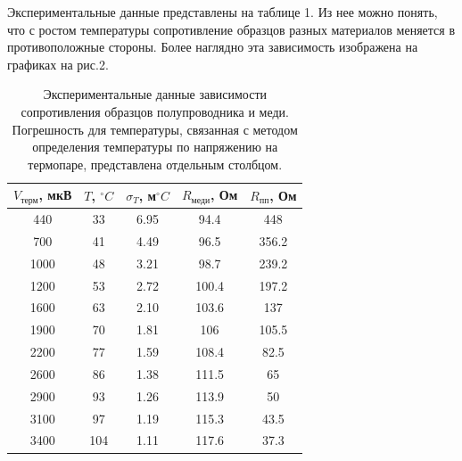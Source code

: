 \documentclass[a4paper, 14pt]{extarticle}%
\newcommand\ECaption[1]{%
     \captionsetup{font=footnotesize}%
     \caption{#1}}
\begin{document}
Экспериментальные данные представлены на таблице 1. Из нее можно понять, что с ростом температуры сопротивление образцов разных материалов меняется в противоположные стороны. Более наглядно эта зависимость изображена на графиках на рис.2.

\begin{table}[h]
\begin{center}
\begin{tabular}{|c|c|c|c|c|}
\hline
\rowcolor[HTML]{9698ED} 
$V_{\text{терм}}$, мкВ & $T$, $^{\circ}C$ & $\sigma_{T}$, м$^{\circ}C$ & $R_{\text{меди}}$, Ом & $R_{\text{пп}}$, Ом \\ \hline
440                    & 33               & 6.95             & 94.4                 & 448                 \\ \hline
\rowcolor[HTML]{9698ED} 
700                    & 41               & 4.49             & 96.5                 & 356.2               \\ \hline
1000                   & 48               & 3.21             & 98.7                 & 239.2               \\ \hline
\rowcolor[HTML]{9698ED} 
1200                   & 53               & 2.72             & 100.4                & 197.2               \\ \hline
1600                   & 63               & 2.10             & 103.6                & 137                 \\ \hline
\rowcolor[HTML]{9698ED} 
1900                   & 70               & 1.81             & 106                  & 105.5               \\ \hline
2200                   & 77               & 1.59             & 108.4                & 82.5                \\ \hline
\rowcolor[HTML]{9698ED} 
2600                   & 86               & 1.38             & 111.5                & 65                  \\ \hline
2900                   & 93               & 1.26             & 113.9                & 50                  \\ \hline
\rowcolor[HTML]{9698ED} 
3100                   & 97               & 1.19             & 115.3                & 43.5                \\ \hline
3400                   & 104              & 1.11             & 117.6                & 37.3                \\ \hline
\end{tabular}
\ECaption{Экспериментальные данные зависимости сопротивления образцов полупроводника и меди. Погрешность для температуры, связанная с методом определения температуры по напряжению на термопаре, представлена отдельным столбцом.}
\end{center}
\end{table}
\end{document}
